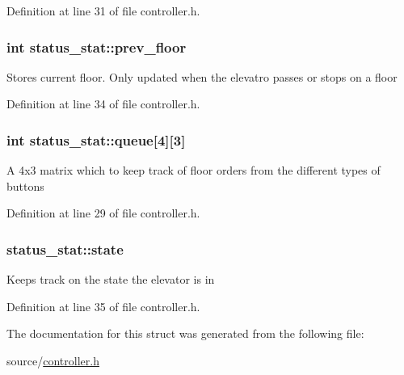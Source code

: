 Definition at line 31 of file controller.\+h.

\subsubsection[{\texorpdfstring{prev\+\_\+floor}{prev_floor}}]{\setlength{\rightskip}{0pt plus 5cm}int status\+\_\+stat\+::prev\+\_\+floor}\hypertarget{structstatus__stat_a4ccf00bc4cb3475a93c3bf5eb2a9a819}{}\label{structstatus__stat_a4ccf00bc4cb3475a93c3bf5eb2a9a819}
Stores current floor. Only updated when the elevatro passes or stops on a floor 

Definition at line 34 of file controller.\+h.

\subsubsection[{\texorpdfstring{queue}{queue}}]{\setlength{\rightskip}{0pt plus 5cm}int status\+\_\+stat\+::queue\mbox{[}4\mbox{]}\mbox{[}3\mbox{]}}\hypertarget{structstatus__stat_ad8dbbabdd11cad499360434a98fc4800}{}\label{structstatus__stat_ad8dbbabdd11cad499360434a98fc4800}
A 4x3 matrix which to keep track of floor orders from the different types of buttons 

Definition at line 29 of file controller.\+h.

\subsubsection[{\texorpdfstring{state}{state}}]{ status\+\_\+stat\+::state}\hypertarget{structstatus__stat_ac485f83fea98239454b3ec1eb49e29cc}{}\label{structstatus__stat_ac485f83fea98239454b3ec1eb49e29cc}
Keeps track on the state the elevator is in 

Definition at line 35 of file controller.\+h.



The documentation for this struct was generated from the following file\+:\begin{DoxyCompactItemize}
\item 
source/\hyperlink{controller_8h}{controller.\+h}\end{DoxyCompactItemize}
